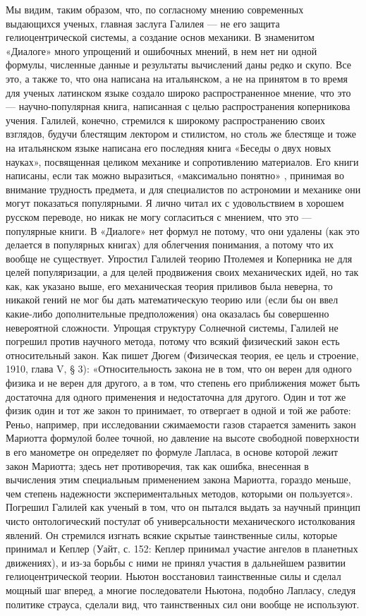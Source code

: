 Мы видим, таким образом, что, по согласному мнению современных выдающихся
ученых, главная заслуга Галилея --- не его защита гелиоцентрической системы, а
создание основ механики. В знаменитом «Диалоге» много упрощений и ошибочных
мнений, в нем нет ни одной формулы, численные данные и результаты вычислений
даны редко и скупо. Все это, а также то, что она написана на итальянском, а не
на принятом в то время для ученых латинском языке создало широко
распространенное мнение, что это --- научно-популярная книга, написанная с целью
распространения коперникова учения. Галилей, конечно, стремился к широкому
распространению своих взглядов, будучи блестящим лектором и стилистом, но столь
же блестяще и тоже на итальянском языке написана его последняя книга «Беседы о
двух новых науках», посвященная целиком механике и сопротивлению материалов.
Его книги написаны, если так можно выразиться, «максимально понятно» , принимая
во внимание трудность предмета, и для специалистов по астрономии и механике они
могут показаться популярными. Я лично читал их с удовольствием в хорошем
русском переводе, но никак не могу согласиться с мнением, что это --- популярные
книги. В «Диалоге» нет формул не потому, что они удалены (как это делается в
популярных книгах) для облегчения понимания, а потому что их вообще не
существует. Упростил Галилей теорию Птолемея и Коперника не для целей
популяризации, а для целей продвижения своих механических идей, но так как, как
указано выше, его механическая теория приливов была неверна, то никакой гений
не мог бы дать математическую теорию или (если бы он ввел какие-либо
дополнительные предположения) она оказалась бы совершенно невероятной
сложности. Упрощая структуру Солнечной системы, Галилей не погрешил против
научного метода, потому что всякий физический закон есть относительный закон.
Как пишет Дюгем (Физическая теория, ее цель и строение, 1910, глава V, § 3):
«Относительность закона не в том, что он верен для одного физика и не верен для
другого, а в том, что степень его приближения может быть достаточна для одного
применения и недостаточна для другого. Один и тот же физик один и тот же закон
то принимает, то отвергает в одной и той же работе: Реньо, например, при
исследовании сжимаемости газов старается заменить закон Мариотта формулой более
точной, но давление на высоте свободной поверхности в его манометре он
определяет по формуле Лапласа, в основе которой лежит закон Мариотта; здесь нет
противоречия, так как ошибка, внесенная в вычисления этим специальным
применением закона Мариотта, гораздо меньше, чем степень надежности
экспериментальных методов, которыми он пользуется». Погрешил Галилей как ученый
в том, что он пытался выдать за научный принцип чисто онтологический постулат
об универсальности механического истолкования явлений. Он стремился изгнать
всякие скрытые таинственные силы, которые принимал и Кеплер (Уайт, с. 152:
Кеплер принимал участие ангелов в планетных движениях), и из-за борьбы с ними
не принял участия в дальнейшем развитии гелиоцентрической теории. Ньютон
восстановил таинственные силы и сделал мощный шаг вперед, а многие
последователи Ньютона, подобно Лапласу, следуя политике страуса, сделали вид,
что таинственных сил они вообще не используют.

